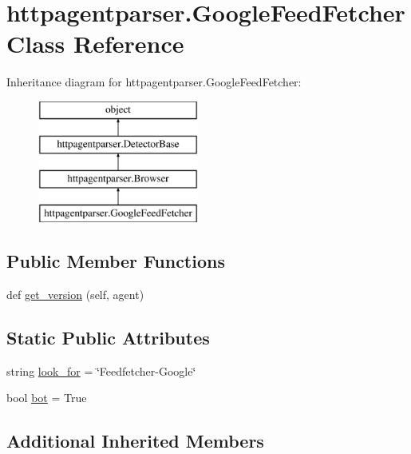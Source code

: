 \hypertarget{classhttpagentparser_1_1_google_feed_fetcher}{}\section{httpagentparser.\+Google\+Feed\+Fetcher Class Reference}
\label{classhttpagentparser_1_1_google_feed_fetcher}
Inheritance diagram for httpagentparser.\+Google\+Feed\+Fetcher\+:\begin{figure}[H]
\begin{center}
\leavevmode
\includegraphics[height=4.000000cm]{classhttpagentparser_1_1_google_feed_fetcher}
\end{center}
\end{figure}
\subsection*{Public Member Functions}
\begin{DoxyCompactItemize}
\item 
def \hyperlink{classhttpagentparser_1_1_google_feed_fetcher_a05382fd53cfd87284a0159ea45279c76}{get\+\_\+version} (self, agent)
\end{DoxyCompactItemize}
\subsection*{Static Public Attributes}
\begin{DoxyCompactItemize}
\item 
string \hyperlink{classhttpagentparser_1_1_google_feed_fetcher_a1b368ba107d6124aacb5e92d0906756b}{look\+\_\+for} = \char`\"{}Feedfetcher-\/Google\char`\"{}
\item 
bool \hyperlink{classhttpagentparser_1_1_google_feed_fetcher_a488c5225365034fcece778fd4b50fb7b}{bot} = True
\end{DoxyCompactItemize}
\subsection*{Additional Inherited Members}


